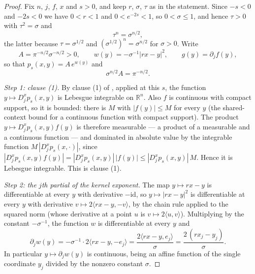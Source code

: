 \begin{proof}
Fix $n$, $j$, $f$, $x$ and $s > 0$, and keep $r$, $\sigma$, $\tau$ as in the statement.
Since $-s < 0$ and $-2s < 0$ we have $0 < r < 1$ and $0 < e^{-2s} < 1$, so
$0 < \sigma \leq 1$, and hence $\tau > 0$ with $\tau^2 = \sigma$ and
\begin{equation*}
  \tau^n = \sigma^{n/2} , \tag{1}
\end{equation*}
the latter because $\tau = \sigma^{1/2}$ and $(\sigma^{1/2})^n = \sigma^{n/2}$ for
$\sigma > 0$.  Write
\[
  A = \pi^{-n/2}\sigma^{-n/2} > 0 ,
  \qquad
  w(y) = -\sigma^{-1}|rx-y|^2 ,
  \qquad
  g(y) = \partial_jf(y) ,
\]
so that $p_s(x,y) = A\,e^{w(y)}$ and
\begin{equation*}
  \sigma^{n/2}A = \pi^{-n/2} . \tag{2}
\end{equation*}

\emph{Step 1: clause (1).}
By clause (1) of , applied at this $s$, the function
$y \mapsto D_j^xp_s(x,y)$ is Lebesgue integrable on $\mathbb{R}^n$.  Also $f$ is
continuous with compact support, so it is bounded: there is $M$ with $|f(y)| \leq M$ for
every $y$ (the shared-context bound for a continuous function with compact support).  The
product $y \mapsto D_j^xp_s(x,y)f(y)$ is therefore measurable --- a product of a
measurable and a continuous function --- and dominated in absolute value by the
integrable function $M\,|D_j^xp_s(x,\cdot)|$, since
$|D_j^xp_s(x,y)f(y)| = |D_j^xp_s(x,y)|\,|f(y)| \leq |D_j^xp_s(x,y)|\,M$.  Hence it is
Lebesgue integrable.  This is clause (1).

\emph{Step 2: the $j$th partial of the kernel exponent.}
The map $y \mapsto rx-y$ is differentiable at every $y$ with derivative $-\mathrm{id}$,
so $y \mapsto |rx-y|^2$ is differentiable at every $y$ with derivative
$v \mapsto 2\langle rx-y,-v\rangle$, by the chain rule applied to the squared norm (whose
derivative at a point $u$ is $v \mapsto 2\langle u,v\rangle$).  Multiplying by the
constant $-\sigma^{-1}$, the function $w$ is differentiable at every $y$ and
\begin{equation*}
  \partial_jw(y) = -\sigma^{-1}\cdot2\langle rx-y,-e_j\rangle
    = \frac{2\langle rx-y,e_j\rangle}{\sigma}
    = \frac{2\,(rx_j-y_j)}{\sigma} . \tag{3}
\end{equation*}
In particular $y \mapsto \partial_jw(y)$ is continuous, being an affine function of the
single coordinate $y_j$ divided by the nonzero constant $\sigma$.


\end{proof}
